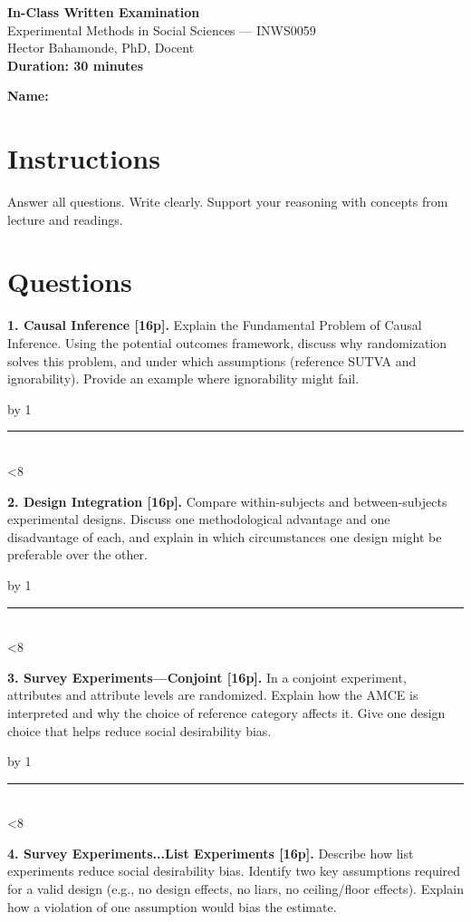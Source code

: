 \documentclass[12pt]{article}
\newcommand{\answerlines}[1]{%
  \mycount=0%
  \vspace{0.2cm}%
  \loop
    \advance\mycount by 1%
    \noindent\rule{\linewidth}{0.4pt}\\[0.4cm]
  \ifnum\mycount<#1
  \repeat
  \vspace{0.2cm}
}
\begin{document}
\begin{center}
    {\Large \textbf{In-Class Written Examination}}\\[4pt]
    {\large Experimental Methods in Social Sciences — INWS0059}\\[2pt]
    {\large Hector Bahamonde, PhD, Docent}\\[10pt]
    {\large \textbf{Duration: 30 minutes}}\\[6pt]
\end{center}

\vspace{0.2cm}

\textbf{Name:} \hrulefill

\vspace{0.2cm}

\section*{Instructions}
Answer all questions. Write clearly. Support your reasoning with concepts from lecture and readings.  

\vspace{0.1cm}

\section*{Questions}

\textbf{1. Causal Inference [16p].} Explain the Fundamental Problem of Causal Inference. Using the potential outcomes framework, discuss why randomization solves this problem, and under which assumptions (reference SUTVA and ignorability). Provide an example where ignorability might fail.  

\answerlines{8}

\textbf{2. Design Integration [16p].} Compare within-subjects and between-subjects experimental designs. Discuss one methodological advantage and one disadvantage of each, and explain in which circumstances one design might be preferable over the other.  

\answerlines{8}

\textbf{3. Survey Experiments---Conjoint [16p].}  
In a conjoint experiment, attributes and attribute levels are randomized. Explain how the AMCE is interpreted and why the choice of reference category affects it. Give one design choice that helps reduce social desirability bias.  

\answerlines{8}

\textbf{4. Survey Experiments...List Experiments [16p].} Describe how list experiments reduce social desirability bias. Identify two key assumptions required for a valid design (e.g., no design effects, no liars, no ceiling/floor effects). Explain how a violation of one assumption would bias the estimate.  
 
\end{document}
